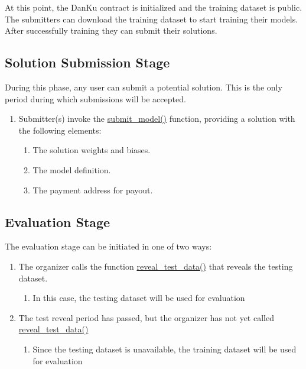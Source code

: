 \documentclass{article}
\begin{document}
At this point, the DanKu contract is initialized and the training dataset is public. The submitters can download the training dataset to start training their models. After successfully training they can submit their solutions.

\subsection{Solution Submission Stage}

During this phase, any user can submit a potential solution. This is the only period during which submissions will be accepted.

\begin{enumerate}
\item Submitter(s) invoke the \underline{submit\_model()} function, providing a solution with the following elements:
    \begin{enumerate}
    \item The solution weights and biases.
    \item The model definition.
    \item The payment address for payout.
    \end{enumerate}
\end{enumerate}

\subsection{Evaluation Stage}

The evaluation stage can be initiated in one of two ways:

\begin{enumerate}
\item The organizer calls the function \underline{reveal\_test\_data()} that reveals the testing dataset.
    \begin{enumerate}
    \item In this case, the testing dataset will be used for evaluation
    \end{enumerate}
\item The test reveal period has passed, but the organizer has not yet called \underline{reveal\_test\_data()}
    \begin{enumerate}
    \item Since the testing dataset is unavailable, the training dataset will be used for evaluation
    \end{enumerate}
\end{enumerate}
\end{document}
